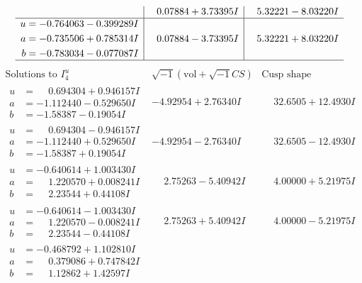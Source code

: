 \documentclass[1p]{elsarticle_modified}
\theoremstyle{definition}
\newcommand{\I}{\sqrt{-1}}
\begin{document}
$$\begin{array}{c|c|c}
 & \phantom{-}0.07884 + 3.73395 I & \phantom{-}5.32221 - 8.03220 I \\ \hline\begin{aligned}
u &= -0.764063 - 0.399289 I \\
a &= -0.735506 + 0.785314 I \\
b &= -0.783034 - 0.077087 I\end{aligned}
 & \phantom{-}0.07884 - 3.73395 I & \phantom{-}5.32221 + 8.03220 I\\
 \hline 
 \end{array}$$\newpage$$\begin{array}{c|c|c}  
\text{Solutions to }I^u_{4}& \I (\text{vol} + \sqrt{-1}CS) & \text{Cusp shape}\\
 \hline 
\begin{aligned}
u &= \phantom{-}0.694304 + 0.946157 I \\
a &= -1.112440 - 0.529650 I \\
b &= -1.58387 - 0.19054 I\end{aligned}
 & -4.92954 + 2.76340 I & \phantom{-}32.6505 + 12.4930 I \\ \hline\begin{aligned}
u &= \phantom{-}0.694304 - 0.946157 I \\
a &= -1.112440 + 0.529650 I \\
b &= -1.58387 + 0.19054 I\end{aligned}
 & -4.92954 - 2.76340 I & \phantom{-}32.6505 - 12.4930 I \\ \hline\begin{aligned}
u &= -0.640614 + 1.003430 I \\
a &= \phantom{-}1.220570 + 0.008241 I \\
b &= \phantom{-}2.23544 + 0.44108 I\end{aligned}
 & \phantom{-}2.75263 - 5.40942 I & \phantom{-}4.00000 + 5.21975 I \\ \hline\begin{aligned}
u &= -0.640614 - 1.003430 I \\
a &= \phantom{-}1.220570 - 0.008241 I \\
b &= \phantom{-}2.23544 - 0.44108 I\end{aligned}
 & \phantom{-}2.75263 + 5.40942 I & \phantom{-}4.00000 - 5.21975 I \\ \hline\begin{aligned}
u &= -0.468792 + 1.102810 I \\
a &= \phantom{-}0.379086 + 0.747842 I \\
b &= \phantom{-}1.12862 + 1.42597 I\end{aligned}

\end{array}$$
\end{document}

